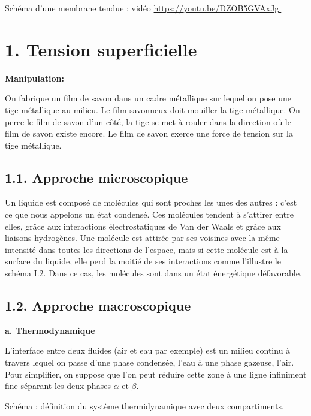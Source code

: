 \documentclass[french, a4paper, 10pt, twocolumn, landscape]{article}
\begin{document}
Schéma d'une membrane tendue : vidéo   \url{https://youtu.be/DZOB5GVAxJg.}


\section*{1. Tension superficielle}

\textbf{Manipulation: }
  
On fabrique un film de savon dans un cadre m{\'e}tallique sur lequel on pose une tige m{\'e}tallique au milieu. Le film savonneux doit mouiller la tige m{\'e}tallique. On perce le film de savon d'un c{\^o}t{\'e}, la tige se met {\`a} rouler dans la direction o{\`u} le film de savon existe encore. Le film de savon exerce une force de tension sur la tige m{\'e}tallique. 


\subsection*{1.1. Approche microscopique }

Un liquide est compos{\'e} de mol{\'e}cules qui sont proches les unes des autres : c'est ce que nous appelons un {\'e}tat condens{\'e}. Ces mol{\'e}cules tendent {\`a} s'attirer entre elles, gr{\^a}ce aux interactions {\'e}lectrostatiques de Van der Waals et gr{\^a}ce aux liaisons hydrog{\`e}nes. Une mol{\'e}cule est attir{\'e}e par ses voisines avec la m{\^e}me intensit{\'e} dans toutes les directions de l'espace, mais si cette mol{\'e}cule est {\`a} la surface du liquide, elle perd la moiti{\'e} de ses interactions comme l'illustre le sch{\'e}ma I.2. Dans ce cas, les mol{\'e}cules sont dans un {\'e}tat {\'e}nerg{\'e}tique d{\'e}favorable.



\subsection*{1.2. Approche macroscopique}

\textbf{a.  Thermodynamique}

L'interface entre deux fluides (air et eau par exemple) est un milieu continu à travers lequel on passe d'une phase condensée, l'eau à une phase gazeuse, l'air. Pour simplifier, on suppose que l'on peut réduire cette zone à une ligne infiniment fine s{\'e}parant les deux phases $\alpha$ et $\beta$.

Schéma : définition du système thermidynamique avec deux compartiments. 
\end{document}
